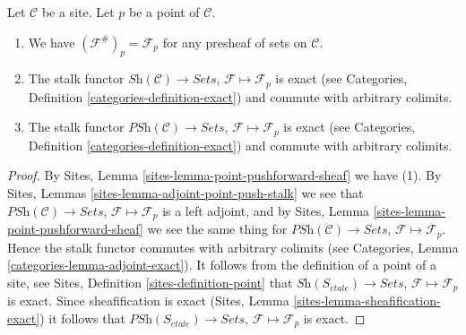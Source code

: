 \begin{lemma}
\label{lemma-stalk-exact}
Let $\mathcal{C}$ be a site.
Let $p$ be a point of $\mathcal{C}$.
\begin{enumerate}
\item We have $(\mathcal{F}^\#)_p = \mathcal{F}_p$
for any presheaf of sets on $\mathcal{C}$.
\item The stalk functor
$\textit{Sh}(\mathcal{C}) \to \textit{Sets}$,
$\mathcal{F} \mapsto \mathcal{F}_p$ is exact (see
Categories, Definition \ref{categories-definition-exact})
and commute with arbitrary colimits.
\item The stalk functor
$\textit{PSh}(\mathcal{C}) \to \textit{Sets}$,
$\mathcal{F} \mapsto \mathcal{F}_p$ is exact (see
Categories, Definition \ref{categories-definition-exact})
and commute with arbitrary colimits.
\end{enumerate}
\end{lemma}

\begin{proof}
By
Sites, Lemma \ref{sites-lemma-point-pushforward-sheaf}
we have (1).
By
Sites, Lemmas \ref{sites-lemma-adjoint-point-push-stalk}
we see that
$\textit{PSh}(\mathcal{C}) \to \textit{Sets}$,
$\mathcal{F} \mapsto \mathcal{F}_p$ is a left adjoint,
and by
Sites, Lemma \ref{sites-lemma-point-pushforward-sheaf}
we see the same thing for
$\textit{PSh}(\mathcal{C}) \to \textit{Sets}$,
$\mathcal{F} \mapsto \mathcal{F}_p$.
Hence the stalk functor commutes with arbitrary colimits (see
Categories, Lemma \ref{categories-lemma-adjoint-exact}).
It follows from the definition of a point of a site, see
Sites, Definition \ref{sites-definition-point}
that $\textit{Sh}(S_{\acute{e}tale}) \to \textit{Sets}$,
$\mathcal{F} \mapsto \mathcal{F}_p$
is exact. Since sheafification is exact
(Sites, Lemma \ref{sites-lemma-sheafification-exact})
it follows that $\textit{PSh}(S_{\acute{e}tale}) \to \textit{Sets}$,
$\mathcal{F} \mapsto \mathcal{F}_p$
is exact.
\end{proof}


